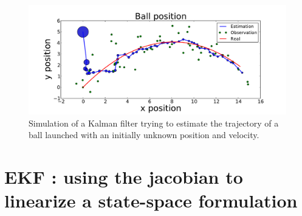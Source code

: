 \documentclass[10pt,oneside]{scrartcl}
\begin{document}
\begin{figure}[htbp]
  \center \includegraphics[width=0.8\linewidth]{Examples/KF-Ex/KF-ex1.pdf}
  \caption{\label{fig:KF-ex1} Simulation of a Kalman filter trying to
    estimate the trajectory of a ball launched with an initially
    unknown position and velocity.}
\end{figure}


\pagebreak

\section{EKF : using the jacobian to linearize a state-space formulation}
\end{document}
